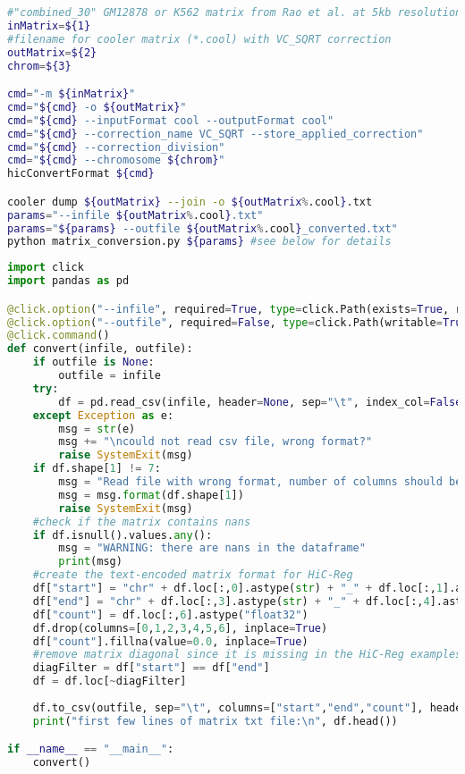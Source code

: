 \begin{lstlisting}[language=bash, caption=Cooler matrices to HiC-Reg input format, label=list:methods:convertForHicReg_bash]
#"combined_30" GM12878 or K562 matrix from Rao et al. at 5kb resolution
inMatrix=${1} 
#filename for cooler matrix (*.cool) with VC_SQRT correction
outMatrix=${2} 
chrom=${3}

cmd="-m ${inMatrix}"
cmd="${cmd} -o ${outMatrix}"
cmd="${cmd} --inputFormat cool --outputFormat cool" 
cmd="${cmd} --correction_name VC_SQRT --store_applied_correction"
cmd="${cmd} --correction_division"
cmd="${cmd} --chromosome ${chrom}" 
hicConvertFormat ${cmd}

cooler dump ${outMatrix} --join -o ${outMatrix%.cool}.txt
params="--infile ${outMatrix%.cool}.txt"
params="${params} --outfile ${outMatrix%.cool}_converted.txt"
python matrix_conversion.py ${params} #see below for details
\end{lstlisting}

\begin{lstlisting}[language=python, caption=Custom text file conversion for HiC-Reg's matrix input, label=list:methods:convertForHicReg_python]
import click
import pandas as pd

@click.option("--infile", required=True, type=click.Path(exists=True, readable=True, dir_okay=False), help="text file created by cooler dump with --join")
@click.option("--outfile", required=False, type=click.Path(writable=True, dir_okay=False))
@click.command()
def convert(infile, outfile):
	if outfile is None:
		outfile = infile
	try:
		df = pd.read_csv(infile, header=None, sep="\t", index_col=False)
	except Exception as e:
		msg = str(e)
		msg += "\ncould not read csv file, wrong format?"
		raise SystemExit(msg)
	if df.shape[1] != 7:
		msg = "Read file with wrong format, number of columns should be 7 but is {:d}"
		msg = msg.format(df.shape[1])
		raise SystemExit(msg)
	#check if the matrix contains nans
	if df.isnull().values.any():
		msg = "WARNING: there are nans in the dataframe"
		print(msg)
	#create the text-encoded matrix format for HiC-Reg
	df["start"] = "chr" + df.loc[:,0].astype(str) + "_" + df.loc[:,1].astype(str) + "_" + df.loc[:,2].astype(str)
	df["end"] = "chr" + df.loc[:,3].astype(str) + "_" + df.loc[:,4].astype(str) + "_" + df.loc[:,5].astype(str)
	df["count"] = df.loc[:,6].astype("float32")
	df.drop(columns=[0,1,2,3,4,5,6], inplace=True)
	df["count"].fillna(value=0.0, inplace=True)
	#remove matrix diagonal since it is missing in the HiC-Reg examples, too
	diagFilter = df["start"] == df["end"]
	df = df.loc[~diagFilter]
	
	df.to_csv(outfile, sep="\t", columns=["start","end","count"], header=False, index=False, float_format="%.4f")
	print("first few lines of matrix txt file:\n", df.head())

if __name__ == "__main__":
	convert()
\end{lstlisting}

